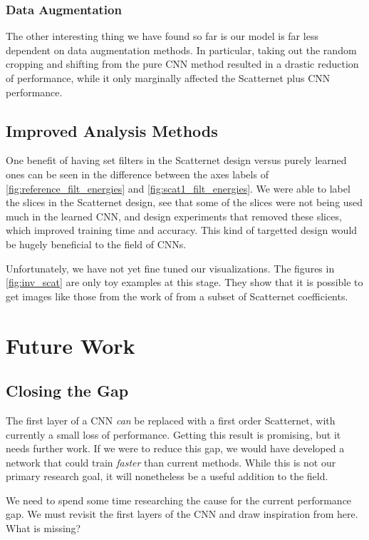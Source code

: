 \subsubsection{Data Augmentation}
  The other interesting thing we have found so far is our model is far less
  dependent on data augmentation methods. In particular, taking out the random
  cropping and shifting from the pure CNN method resulted in a drastic
  reduction of performance, while it only marginally affected the Scatternet
  plus CNN performance.

\subsection{Improved Analysis Methods}
  One benefit of having set filters in the Scatternet design versus purely
  learned ones can be seen in the difference between the axes labels of
  \autoref{fig:reference_filt_energies} and \autoref{fig:scat1_filt_energies}.
  We were able to label the slices in the Scatternet design, see that some of
  the slices were not being used much in the learned CNN, and design
  experiments that removed these slices, which improved training time and
  accuracy. This kind of targetted design would be
  hugely beneficial to the field of CNNs.

  Unfortunately, we have not yet fine tuned our visualizations. The figures in
  \autoref{fig:inv_scat} are only toy examples at this stage. They show that
  it is possible to get images like those from the work of
  \citet{zeiler_visualizing_2014} from a subset of Scatternet
  coefficients. 

\section{Future Work}\label{sec:future_work}
  
\subsection{Closing the Gap}\label{sec:closing_the_gap}
  The first layer of a CNN \emph{can} be replaced with a first order
  Scatternet, with currently a small loss of performance.  Getting this result is
  promising, but it needs further work. If we were to reduce this gap, we would
  have developed a network that could train \emph{faster} than current methods.
  While this is not our primary research goal, it will nonetheless be a useful
  addition to the field.

  We need to spend some time researching the cause for the current performance
  gap. We must revisit the first layers of the CNN and draw inspiration from
  here. What is missing?


